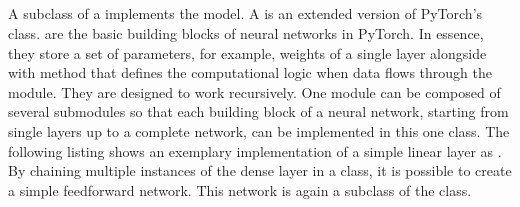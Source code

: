 \documentclass[letterpaper,10pt,english]{jupyterBook}
\begin{document}
\subsection{}
\label{\detokenize{PyTorchLightning:lightningmodule}}
\sphinxAtStartPar
A subclass of a  implements the model.
A  is an extended version of PyTorch’s  class.
 are the basic building blocks of neural networks in PyTorch. In essence, they store a set of parameters, for example, weights of a single layer alongside with \sphinxhyphen{}method that defines the computational logic when data flows through the module. They are designed to work recursively. One module can be composed of several submodules so that each building block of a neural network, starting from single layers up to a complete network, can be implemented in this one class.
The following listing shows an exemplary implementation of a simple linear layer as .
By chaining multiple instances of the dense layer in a  class, it is possible to create a simple feed\sphinxhyphen{}forward network.
This network is again a subclass of the  class.
\end{document}
